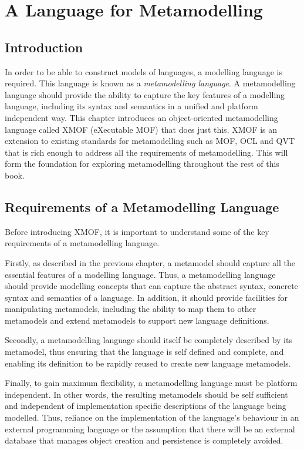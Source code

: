 \chapter{A Language for Metamodelling}
\label{xmofchapter}

\section{Introduction}

In order to be able to construct models of languages, a modelling
language is required. This language is known as a {\em
metamodelling language}. A metamodelling language should provide
the ability to capture the key features of a modelling language,
including its syntax and semantics in a unified and platform
independent way. This chapter introduces an object-oriented
metamodelling language called XMOF (eXecutable MOF) that does just
this. XMOF is an extension to existing standards for metamodelling
such as MOF, OCL and QVT that is rich enough to address all the
requirements of metamodelling. This will form the foundation for
exploring metamodelling throughout the rest of this book.

\section{Requirements of a Metamodelling Language}

Before introducing XMOF, it is important to understand some of the
key requirements of a metamodelling language.

Firstly, as described in the previous chapter, a metamodel should
capture all the essential features of a modelling language. Thus,
a metamodelling language should provide modelling concepts that
can capture the abstract syntax, concrete syntax and semantics of
a language. In addition, it should provide facilities for
manipulating metamodels, including the ability to map them to
other metamodels and extend metamodels to support new language
definitions.

Secondly, a metamodelling language should itself be completely
described by its metamodel, thus ensuring that the language is
self defined and complete, and enabling its definition to be
rapidly reused to create new language metamodels.

Finally, to gain maximum flexibility, a metamodelling language
must be platform independent. In other words, the resulting
metamodels should be self sufficient and independent of
implementation specific descriptions of the language being
modelled. Thus, reliance on the implementation of the language's
behaviour in an external programming language or the assumption
that there will be an external database that manages object
creation and persistence is completely avoided.


